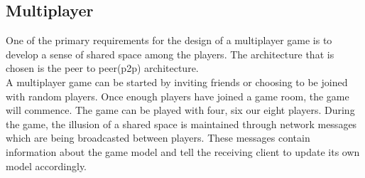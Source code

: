 \subsection*{Multiplayer}
One of the primary requirements for the design of a multiplayer game is to develop a sense of shared space among the players. The architecture that is chosen is the peer to peer(p2p) architecture. \\
A multiplayer game can be started by inviting friends or choosing to be joined with random players. Once enough players have joined a game room, the game will commence. The game can be played with four, six our eight players. During the game, the illusion of a shared space is maintained through network messages which are being broadcasted between players. These messages contain information about the game model and tell the receiving client to update its own model accordingly.

